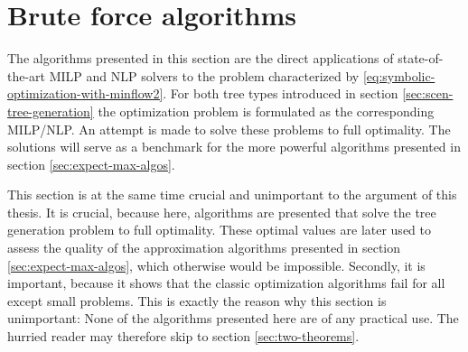\section{Brute force algorithms}
\label{sec:naive}
The algorithms presented in this section are the direct applications of state-of-the-art MILP and NLP solvers to the problem characterized by \eqref{eq:symbolic-optimization-with-minflow2}. For both tree types introduced in section \ref{sec:scen-tree-generation} the optimization problem is formulated as the corresponding MILP/NLP. An attempt is made to solve these problems to full optimality.
The solutions will serve as a benchmark for the more powerful algorithms presented in section \ref{sec:expect-max-algos}.

This section is at the same time crucial and unimportant to the argument of this thesis.
It is crucial, because here, algorithms are presented that solve the tree generation problem to full optimality.
These optimal values are later used to assess the quality of the approximation algorithms presented in section \ref{sec:expect-max-algos}, which otherwise would be impossible.
Secondly, it is important, because it shows that the classic optimization algorithms fail for all except small problems.
This is exactly the reason why this section is unimportant: None of the algorithms presented here are of any practical use.
The hurried reader may therefore skip to section \ref{sec:two-theorems}.


